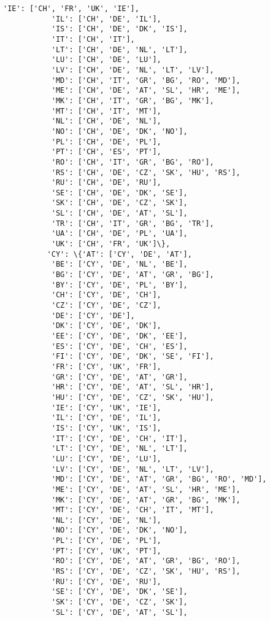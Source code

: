 \documentclass[11pt]{article}
\begin{document}
\begin{Verbatim}[commandchars=\\\{\}]
           'IE': ['CH', 'FR', 'UK', 'IE'],
           'IL': ['CH', 'DE', 'IL'],
           'IS': ['CH', 'DE', 'DK', 'IS'],
           'IT': ['CH', 'IT'],
           'LT': ['CH', 'DE', 'NL', 'LT'],
           'LU': ['CH', 'DE', 'LU'],
           'LV': ['CH', 'DE', 'NL', 'LT', 'LV'],
           'MD': ['CH', 'IT', 'GR', 'BG', 'RO', 'MD'],
           'ME': ['CH', 'DE', 'AT', 'SL', 'HR', 'ME'],
           'MK': ['CH', 'IT', 'GR', 'BG', 'MK'],
           'MT': ['CH', 'IT', 'MT'],
           'NL': ['CH', 'DE', 'NL'],
           'NO': ['CH', 'DE', 'DK', 'NO'],
           'PL': ['CH', 'DE', 'PL'],
           'PT': ['CH', 'ES', 'PT'],
           'RO': ['CH', 'IT', 'GR', 'BG', 'RO'],
           'RS': ['CH', 'DE', 'CZ', 'SK', 'HU', 'RS'],
           'RU': ['CH', 'DE', 'RU'],
           'SE': ['CH', 'DE', 'DK', 'SE'],
           'SK': ['CH', 'DE', 'CZ', 'SK'],
           'SL': ['CH', 'DE', 'AT', 'SL'],
           'TR': ['CH', 'IT', 'GR', 'BG', 'TR'],
           'UA': ['CH', 'DE', 'PL', 'UA'],
           'UK': ['CH', 'FR', 'UK']\},
          'CY': \{'AT': ['CY', 'DE', 'AT'],
           'BE': ['CY', 'DE', 'NL', 'BE'],
           'BG': ['CY', 'DE', 'AT', 'GR', 'BG'],
           'BY': ['CY', 'DE', 'PL', 'BY'],
           'CH': ['CY', 'DE', 'CH'],
           'CZ': ['CY', 'DE', 'CZ'],
           'DE': ['CY', 'DE'],
           'DK': ['CY', 'DE', 'DK'],
           'EE': ['CY', 'DE', 'DK', 'EE'],
           'ES': ['CY', 'DE', 'CH', 'ES'],
           'FI': ['CY', 'DE', 'DK', 'SE', 'FI'],
           'FR': ['CY', 'UK', 'FR'],
           'GR': ['CY', 'DE', 'AT', 'GR'],
           'HR': ['CY', 'DE', 'AT', 'SL', 'HR'],
           'HU': ['CY', 'DE', 'CZ', 'SK', 'HU'],
           'IE': ['CY', 'UK', 'IE'],
           'IL': ['CY', 'DE', 'IL'],
           'IS': ['CY', 'UK', 'IS'],
           'IT': ['CY', 'DE', 'CH', 'IT'],
           'LT': ['CY', 'DE', 'NL', 'LT'],
           'LU': ['CY', 'DE', 'LU'],
           'LV': ['CY', 'DE', 'NL', 'LT', 'LV'],
           'MD': ['CY', 'DE', 'AT', 'GR', 'BG', 'RO', 'MD'],
           'ME': ['CY', 'DE', 'AT', 'SL', 'HR', 'ME'],
           'MK': ['CY', 'DE', 'AT', 'GR', 'BG', 'MK'],
           'MT': ['CY', 'DE', 'CH', 'IT', 'MT'],
           'NL': ['CY', 'DE', 'NL'],
           'NO': ['CY', 'DE', 'DK', 'NO'],
           'PL': ['CY', 'DE', 'PL'],
           'PT': ['CY', 'UK', 'PT'],
           'RO': ['CY', 'DE', 'AT', 'GR', 'BG', 'RO'],
           'RS': ['CY', 'DE', 'CZ', 'SK', 'HU', 'RS'],
           'RU': ['CY', 'DE', 'RU'],
           'SE': ['CY', 'DE', 'DK', 'SE'],
           'SK': ['CY', 'DE', 'CZ', 'SK'],
           'SL': ['CY', 'DE', 'AT', 'SL'],

\end{Verbatim}
\end{document}
